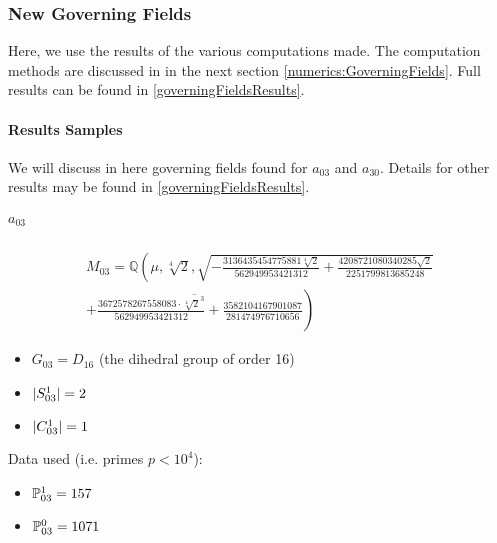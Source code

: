 \subsubsection{New Governing Fields}
Here, we use the results of the various computations made.
The computation methods are discussed in in the next section \ref{numerics:GoverningFields}.
Full results can be found in \ref{governingFieldsResults}.

\paragraph{Results Samples}
We will discuss in here governing fields found for $a_{03}$ and $a_{30}$.
Details for other results may be found in \ref{governingFieldsResults}.

\subparagraph{$a_{03}$}
\begin{multline*}
	M_{03} = \mathbb{Q}\left(\mu, \sqrt[4]{2}, 
	\sqrt{
		- \frac{3136435454775881 \sqrt[4]{2}}{562949953421312} 
		+ \frac{4208721080340285 \sqrt{2}}{2251799813685248} 
	}\right. \\
	\left. \overline{ 
		+ \frac{3672578267558083 \cdot \sqrt[4]{2}^3}{562949953421312} 
		+ \frac{3582104167901087}{281474976710656}
	}\right)
\end{multline*}
\setlength{\columnsep}{0.85cm}
\begin{multicols}{2}
	\begin{itemize}
		\item $G_{03} = D_{16}$ (the dihedral group of order 16)
		\item $| S_{03}^1 | = 2$
		\item $| C_{03}^1 | = 1$
	\end{itemize}
	Data used (i.e. primes $p<10^4$):
	\begin{itemize}
		\item $\mathbb{P}_{03}^1 = 157$
		\item $\mathbb{P}_{03}^0 = 1071$
	\end{itemize}
\end{multicols}

